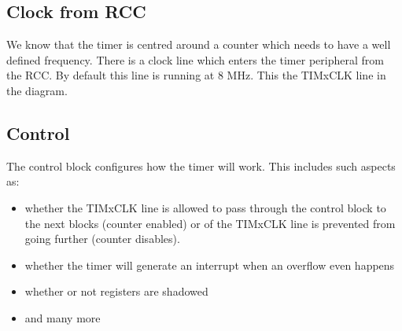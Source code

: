 \subsection{Clock from RCC}
We know that the timer is centred around a counter which needs to have a well defined frequency. There is a clock line which enters the timer peripheral from the RCC. By default this line is running at 8 MHz. This the TIMxCLK line in the diagram. 

\subsection{Control}
The control block configures how the timer will work. This includes such aspects as:
\begin{itemize}
\item whether the TIMxCLK line is allowed to pass through the control block to the next blocks (counter enabled) or of the TIMxCLK line is prevented from going further (counter disables).
\item whether the timer will generate an interrupt when an overflow even happens
\item whether or not registers are shadowed
\item and many more
\end{itemize}


